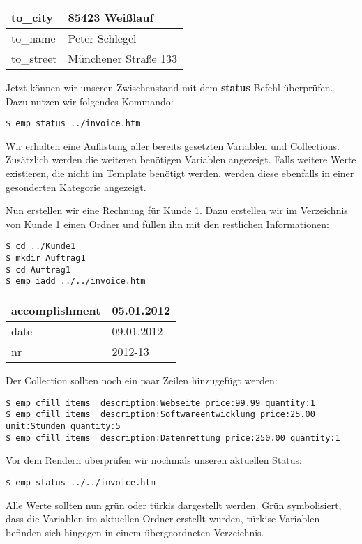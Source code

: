 \vspace{0.5em}
\begin{tabular}{| l | l |}
	\hline
	to\_city & 85423 Weißlauf \\
	\hline
	to\_name & Peter Schlegel \\
	\hline
	to\_street & Münchener Straße 133 \\
	\hline
\end{tabular}
\vspace{0.5em}

Jetzt können wir unseren Zwischenstand mit dem \textbf{status}-Befehl überprüfen. Dazu nutzen wir folgendes Kommando:
\begin{lstlisting}[style=Bash]
$ emp status ../invoice.htm
\end{lstlisting}

Wir erhalten eine Auflistung aller bereits gesetzten Variablen und Collections. Zusätzlich werden die weiteren benötigen Variablen angezeigt. Falls weitere Werte existieren, die nicht im Template benötigt werden, werden diese ebenfalls in einer gesonderten Kategorie angezeigt.

\vspace{0.5em}
Nun erstellen wir eine Rechnung für Kunde 1. Dazu erstellen wir im Verzeichnis von Kunde 1 einen Ordner und füllen ihn mit den restlichen Informationen:

\begin{lstlisting}[style=Bash]
$ cd ../Kunde1
$ mkdir Auftrag1
$ cd Auftrag1
$ emp iadd ../../invoice.htm
\end{lstlisting}

\begin{tabular}{| l | l |}
	\hline
	accomplishment & 05.01.2012 \\
	\hline
	date & 09.01.2012 \\
	\hline
	nr & 2012-13 \\
	\hline
\end{tabular}
\vspace{0.5em}

Der Collection sollten noch ein paar Zeilen hinzugefügt werden:
\begin{lstlisting}[style=Bash]
$ emp cfill items  description:Webseite price:99.99 quantity:1
$ emp cfill items  description:Softwareentwicklung price:25.00 unit:Stunden quantity:5
$ emp cfill items  description:Datenrettung price:250.00 quantity:1
\end{lstlisting}

Vor dem Rendern überprüfen wir nochmals unseren aktuellen Status:
\begin{lstlisting}[style=Bash]
$ emp status ../../invoice.htm
\end{lstlisting}
Alle Werte sollten nun grün oder türkis dargestellt werden. Grün symbolisiert, dass die Variablen im aktuellen Ordner erstellt wurden, türkise Variablen befinden sich hingegen in einem übergeordneten Verzeichnis.

